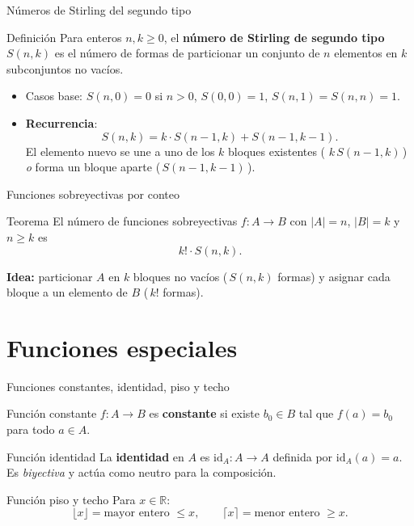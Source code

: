 \documentclass[10pt,xcolor=dvipsnames]{beamer}
\begin{document}
\begin{frame}{Números de Stirling del segundo tipo}
  \begin{block}{Definición}
    Para enteros $n, k \geq 0$, el \textbf{número de Stirling de segundo
    tipo} $S(n,k)$ es el \alert{número de formas de particionar un conjunto
    de $n$ elementos en $k$ subconjuntos no vacíos}.
  \end{block}

  \begin{itemize}
    \item Casos base: $S(n,0) = 0$ si $n > 0$, $S(0,0) = 1$, $S(n,1) = S(n,n) = 1$.
    \item \textbf{Recurrencia}:
      \[
        S(n,k) = k \cdot S(n-1,k) + S(n-1,k-1).
      \]
      El elemento nuevo se une a uno de los $k$ bloques existentes
      (\,$\,k\,S(n-1,k)\,$) \emph{o} forma un bloque aparte
      (\,$S(n-1,k-1)\,$).
  \end{itemize}
\end{frame}

\begin{frame}{Funciones sobreyectivas por conteo}
  \begin{block}{Teorema}
    El número de funciones sobreyectivas $f : A \to B$ con $|A| = n$,
    $|B| = k$ y $n \geq k$ es
    \[
      k! \cdot S(n,k).
    \]
  \end{block}
  \textbf{Idea:} particionar $A$ en $k$ bloques no vacíos
  ($\,S(n,k)$ formas) y asignar cada bloque a un elemento de $B$
  ($\,k!$ formas).
\end{frame}





\section{Funciones especiales}

\begin{frame}{Funciones constantes, identidad, piso y techo}
  \begin{block}{Función constante}
    $f : A \to B$ es \textbf{constante} si existe $b_0 \in B$ tal que
    $f(a) = b_0$ para todo $a \in A$.
  \end{block}

  \begin{block}{Función identidad}
    La \textbf{identidad} en $A$ es $\mathrm{id}_A : A \to A$ definida por
    $\mathrm{id}_A(a) = a$. Es \emph{biyectiva} y actúa como neutro para la composición.
  \end{block}

  \begin{block}{Función piso y techo}
    Para $x \in \mathbb{R}$:
    \[
      \lfloor x \rfloor = \text{mayor entero } \leq x, \qquad
      \lceil x \rceil = \text{menor entero } \geq x.
    \]
  \end{block}
\end{frame}
\end{document}
